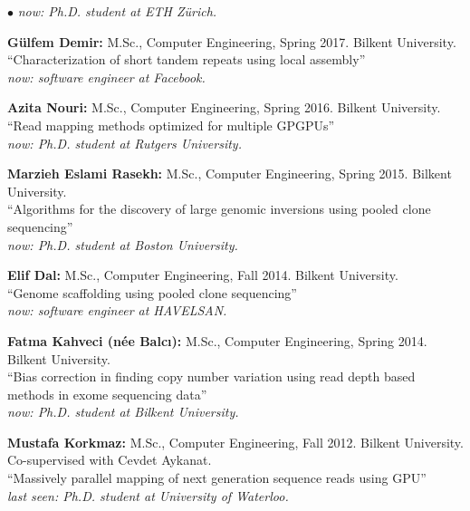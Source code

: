 \documentclass[margin,line]{res}
\newenvironment{list2}{
  \begin{list}{$\bullet$}{%
      \setlength{\itemsep}{0.1cm}
      \setlength{\parsep}{0in} \setlength{\parskip}{0in}
      \setlength{\topsep}{0in} \setlength{\partopsep}{0in} 
      \setlength{\leftmargin}{0.2in}}}{\end{list}}
\begin{document}
\begin{resume}
\begin{list2}
  {\it now: Ph.D. student at ETH Zürich.}
\item
  {\bf Gülfem Demir:} M.Sc., Computer Engineering, Spring 2017.
  Bilkent University. \\
  ``Characterization of short tandem repeats using local assembly''\\
  {\it now: software engineer at Facebook.}
\item
  {\bf Azita Nouri:} M.Sc., Computer Engineering, Spring 2016.
  Bilkent University.\\
  ``Read mapping methods optimized for multiple GPGPUs''\\
  {\it now: Ph.D. student at Rutgers University.}
\item
  {\bf Marzieh Eslami Rasekh:} M.Sc., Computer Engineering, Spring 2015.
  Bilkent University.\\
  ``Algorithms for the discovery of large genomic inversions using pooled clone sequencing''\\
  {\it now: Ph.D. student at Boston University.}
\item
  {\bf Elif Dal:} M.Sc., Computer Engineering, Fall 2014.
  Bilkent University.\\
  ``Genome scaffolding using pooled clone sequencing''\\
  {\it now: software engineer at HAVELSAN.}
\item
  {\bf Fatma Kahveci (n\'{e}e Balc{\i}):} M.Sc., Computer Engineering, Spring 2014.
  Bilkent University.\\
  ``Bias correction in finding copy number variation using read depth based methods in exome sequencing data''\\
  {\it now: Ph.D. student at Bilkent University.}
  \clearpage
\item
 {\bf Mustafa Korkmaz:} M.Sc., Computer Engineering, Fall 2012.
  Bilkent University. \\ Co-supervised with Cevdet Aykanat.\\
  ``Massively parallel mapping of next generation sequence reads using GPU''\\
  {\it last seen: Ph.D. student at University of Waterloo.}
\end{list2}
\vspace*{-.4cm}

\end{resume}
\end{document}
